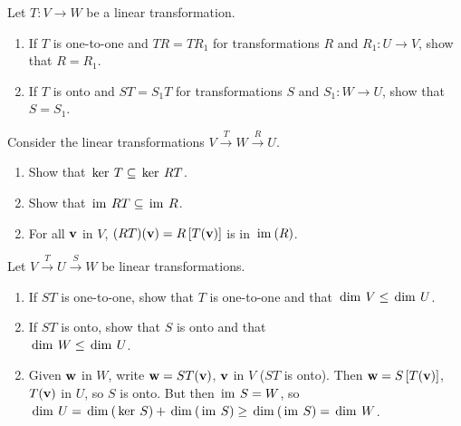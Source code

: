 \begin{multicols}{2}
\begin{ex}
Let $T : V \to W$ be a linear transformation.


\begin{enumerate}[label={\alph*.}]
\item If $T$ is one-to-one and $TR = TR_{1}$ for transformations $R$ and $R_{1} : U \to V$, show that $R = R_{1}$.

\item If $T$ is onto and $ST = S_{1}T$ for transformations $S$ and $S_{1} : W \to U$, show that $S = S_{1}$.

\end{enumerate}
\end{ex}

\begin{ex}
Consider the linear transformations $V \xrightarrow{T} W \xrightarrow{R} U$.

\begin{enumerate}[label={\alph*.}]
\item Show that $\thinspace\operatorname{ker \medspace}T \subseteq \thinspace\operatorname{ker \medspace}RT$.

\item Show that $\thinspace\operatorname{im \medspace}RT \subseteq \thinspace\operatorname{im \medspace}R$.

\end{enumerate}
\begin{sol}
\begin{enumerate}[label={\alph*.}]
\setcounter{enumi}{1}
\item For all $\textbf{v}$ in $V$, $(RT)(\textbf{v}) = R\left[T(\textbf{v})\right]$ is in $\thinspace\operatorname{im\medspace}(R)$.

\end{enumerate}
\end{sol}
\end{ex}

\begin{ex}\label{ex:ex7_3_13}
Let $V \xrightarrow{T} U \xrightarrow{S} W$ be linear transformations.


\begin{enumerate}[label={\alph*.}]
\item If $ST$ is one-to-one, show that $T$ is one-to-one and that $\thinspace\operatorname{dim \medspace}V \leq \thinspace\operatorname{dim \medspace}U$.

\item If $ST$ is onto, show that $S$ is onto and that \\ $\thinspace\operatorname{dim \medspace}W \leq \thinspace\operatorname{dim \medspace}U$.

\end{enumerate}
\begin{sol}
\begin{enumerate}[label={\alph*.}]
\setcounter{enumi}{1}
\item Given $\textbf{w}$ in $W$, write $\textbf{w} = ST(\textbf{v})$, $\textbf{v}$ in $V$ ($ST$ is onto). Then $\textbf{w} = S\left[T(\textbf{v})\right]$, $T(\textbf{v})$ in $U$, so $S$ is onto. But then $\thinspace\operatorname{im \medspace}S = W$, so $\thinspace\operatorname{dim \medspace}U = \thinspace\operatorname{dim\medspace}(\thinspace\operatorname{ker \medspace}S) + \thinspace\operatorname{dim\medspace}(\thinspace\operatorname{im \medspace}S) \geq \thinspace\operatorname{dim\medspace}(\thinspace\operatorname{im \medspace}S) = \thinspace\operatorname{dim \medspace}W$.


\end{enumerate}
\end{sol}
\end{ex}
\end{multicols}
